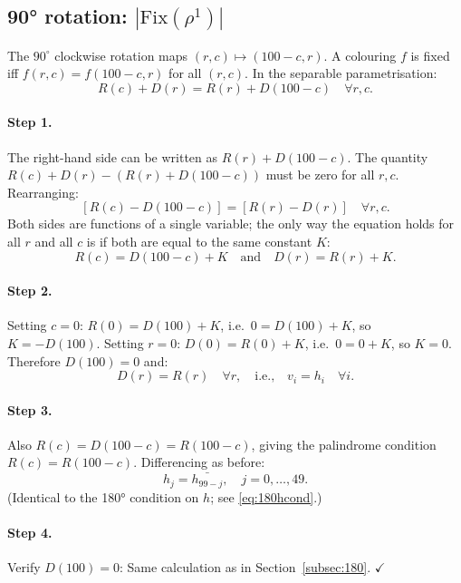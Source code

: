 \documentclass{article}
\newcommand{\Fix}{\mathrm{Fix}}
\newcommand{\comp}[1]{\bar{#1}}   %
\begin{document}
\subsection{90° rotation: $|\Fix(\rho^1)|$}
\label{subsec:90}

The $90^\circ$ clockwise rotation maps
$(r,c)\mapsto(100-c,r)$.  A colouring $f$ is fixed iff
$f(r,c) = f(100-c,r)$ for all $(r,c)$.  In the separable
parametrisation:
\begin{equation}
  R(c)+D(r) = R(r)+D(100-c)\quad\forall r,c.
  \label{eq:90cond}
\end{equation}

\paragraph{Step 1.} The right-hand side can be written as
$R(r) + D(100-c)$.  The quantity $R(c)+D(r)-(R(r)+D(100-c))$
must be zero for all $r,c$.  Rearranging:
\[
  [R(c)-D(100-c)] = [R(r)-D(r)] \quad\forall r,c.
\]
Both sides are functions of a single variable; the only way
the equation holds for all $r$ and all $c$ is if both are
equal to the same constant $K$:
\[
  R(c) = D(100-c)+K\quad\text{and}\quad D(r) = R(r)+K.
\]

\paragraph{Step 2.} Setting $c=0$: $R(0) = D(100)+K$, i.e.\
$0 = D(100)+K$, so $K = -D(100)$.
Setting $r=0$: $D(0) = R(0)+K$, i.e.\ $0 = 0+K$, so $K=0$.
Therefore $D(100) = 0$ and:
\begin{equation}
  D(r) = R(r)\quad\forall r,
  \quad\text{i.e.,}\quad v_i = h_i\quad\forall i.
  \label{eq:90DRR}
\end{equation}

\paragraph{Step 3.} Also $R(c) = D(100-c) = R(100-c)$, giving
the palindrome condition $R(c) = R(100-c)$.  Differencing as
before:
\begin{equation}
  h_j = \comp{h_{99-j}},\quad j = 0,\ldots,49.
  \label{eq:90hcond}
\end{equation}
(Identical to the 180° condition on $h$; see
\eqref{eq:180hcond}.)

\paragraph{Step 4.} Verify $D(100)=0$:
Same calculation as in Section~\ref{subsec:180}. $\checkmark$
\end{document}

